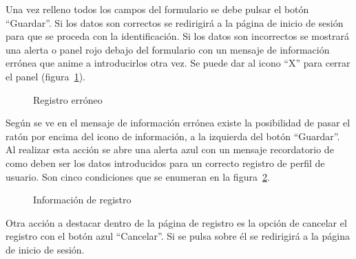 \documentclass[a4paper, 12pt]{book}
\begin{document}
Una vez relleno todos los campos del formulario se debe pulsar el bot\'on ``Guardar''. Si los datos son correctos se redirigir\'a a la p\'agina de inicio
de sesi\'on para que se proceda con la identificaci\'on. Si los datos son incorrectos se mostrar\'a una alerta o panel rojo debajo del formulario con un 
mensaje de informaci\'on err\'onea que anime a introducirlos otra vez. Se puede dar al icono ``X'' para cerrar el panel 
(figura~\ref{figura:registro2}).
\begin{figure}[htbp] 
  \centering
  \caption{Registro err\'oneo}
  \label{figura:registro2}
\end{figure}

Seg\'un se ve en el mensaje de informaci\'on err\'onea existe la posibilidad de pasar el rat\'on por encima del icono de informaci\'on, a la izquierda del 
bot\'on ``Guardar''. Al realizar esta acci\'on se abre una alerta azul con un mensaje recordatorio de como deben ser los datos introducidos para un correcto
registro de perfil de usuario. Son cinco condiciones que se enumeran en la figura~\ref{figura:registro3}.
\begin{figure}[htbp] 
  \centering
  \caption{Informaci\'on de registro}
  \label{figura:registro3}
\end{figure}

Otra acci\'on a destacar dentro de la p\'agina de registro es la opci\'on de cancelar el registro con el bot\'on azul ``Cancelar''. Si se pulsa sobre \'el se
redirigir\'a a la p\'agina de inicio de sesi\'on.
\end{document}
